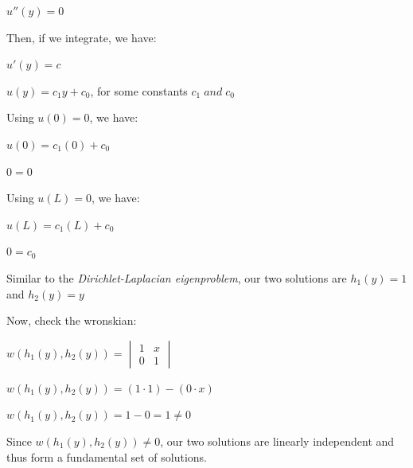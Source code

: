 \documentclass[12pt, executivepaper]{article}
\begin{document}
\begin{flushleft}
\begin{center}

$u''(y)=0$

\end{center}

Then, if we integrate, we have: 

\begin{center}

$u'(y)=c$

$u(y)=c_{1}y+c_{0}$, for some constants $c_{1} \; and \; c_{0}$

\end{center}

Using $u(0)=0$, we have:

\begin{center}

$u(0)=c_{1}(0)+c_{0}$

$0=0$

\end{center}

Using $u(L)=0$, we have: 

\begin{center}

$u(L)=c_{1}(L)+c_{0}$

$0=c_{0}$

\end{center}

Similar to the \textit{Dirichlet-Laplacian eigenproblem}, our two solutions are $h_{1}(y)=1$ and $h_{2}(y)=y$

\vspace{3mm}

Now, check the wronskian:

\begin{center}

$w(h_{1}(y), h_{2}(y))=\begin{vmatrix}
1 & x \\ 
0 & 1 
\end{vmatrix}$

$w(h_{1}(y), h_{2}(y))=(1 \cdot 1)-(0 \cdot x)$

$w(h_{1}(y), h_{2}(y))=1-0=1 \neq 0$

\end{center}

\pagebreak

\vspace*{-40mm}

Since $w(h_{1}(y), h_{2}(y)) \neq 0$, our two solutions are linearly independent and thus form a fundamental set of solutions.


\end{flushleft}
\end{document}
